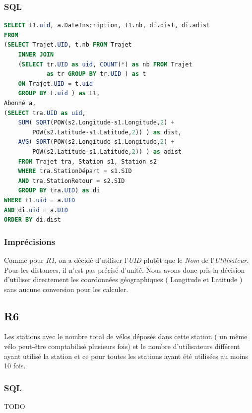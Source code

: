 \documentclass[a4paper, 12pt]{report}
\begin{document}
\subsubsection*{SQL}

\begin{lstlisting}[language=sql]
SELECT t1.uid, a.DateInscription, t1.nb, di.dist, di.adist 
FROM 
(SELECT Trajet.UID, t.nb FROM Trajet
	INNER JOIN
	(SELECT tr.UID as uid, COUNT(*) as nb FROM Trajet 
			as tr GROUP BY tr.UID ) as t
	ON Trajet.UID = t.uid
	GROUP BY t.uid ) as t1,
Abonné a,
(SELECT tra.UID as uid, 
	SUM( SQRT(POW(s2.Longitude-s1.Longitude,2) +
	 	POW(s2.Latitude-s1.Latitude,2)) ) as dist,
	AVG( SQRT(POW(s2.Longitude-s1.Longitude,2) + 
		POW(s2.Latitude-s1.Latitude,2)) ) as adist
	FROM Trajet tra, Station s1, Station s2
	WHERE tra.StationDépart = s1.SID
	AND tra.StationRetour = s2.SID
	GROUP BY tra.UID) as di
WHERE t1.uid = a.UID
AND di.uid = a.UID
ORDER BY di.dist
\end{lstlisting}

\subsubsection*{Imprécisions}

Comme pour \textit{R1}, on a décidé d'utiliser l'\textit{UID} plutôt que le \textit{Nom} de l'\textit{Utilisateur}.
Pour les distances, il n'est pas précisé d'unité. Nous avons donc pris la décision d'utiliser directement les coordonnées géographiques ( Longitude et Latitude ) sans aucune conversion pour les calculer.
\subsection*{R6}

Les stations avec le nombre total de vélos déposés dans cette station ( un même vélo peut-être comptabilisé plusieurs fois) et le nombre d'utilisateurs différent ayant utilisé la station et ce pour toutes les stations ayant été utilisées au moins 10 fois.

\subsubsection*{SQL}
TODO%
\end{document}
